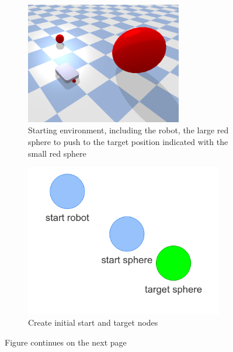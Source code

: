 \begin{figure}[H]
     \centering
     \begin{subfigure}[b]{0.49\textwidth}
         \centering
         \includegraphics[width=0.75\textwidth]{figures/HGraph_example/task.png}
         \caption{Starting environment, including the robot, the large red sphere to push to the target position indicated with the small red sphere}
     \end{subfigure}
     \hfill
     \begin{subfigure}[b]{0.49\textwidth}
         \centering
         \includegraphics[width=0.95\textwidth]{figures/HGraph_example/1.png}
         \caption{Create initial start and target nodes}
     \end{subfigure}
     \caption{Figure continues on the next page}
\end{figure}

